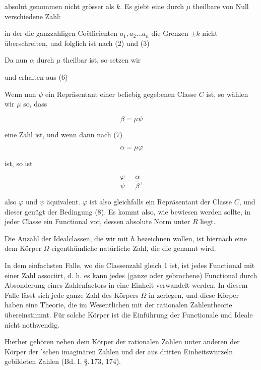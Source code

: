 absolut genommen nicht grösser als $k$. Es giebt eine durch $\mu$ theilbare von Null verschiedene Zahl:


in der die ganzzahligen Coëfficienten $a_1, a_2 \ldots a_n$ die Grenzen $\pm k$ nicht überschreiten, und folglich ist nach (2) und (3)


Da nun $\alpha$ durch $\mu$ theilbar ist, so setzen wir


und erhalten aus (6)


Wenn nun $\psi$ ein Repräsentant einer beliebig gegebenen Classe $C$ ist, so wählen wir $\mu$ so, dass

\[
\beta = \mu\psi
\]

eine Zahl ist, und wenn dann nach (7)

\[
\alpha = \mu\varphi
\]

ist, so ist

\[
\frac{\varphi}{\psi} = \frac{\alpha}{\beta},
\]

also $\varphi$ und $\psi$ äquivalent. $\varphi$ ist also gleichfalls ein Repräsentant der Classe $C$, und dieser genügt der Bedingung (8). Es kommt also, wie bewiesen werden sollte, in jeder Classe ein Functional vor, dessen absolute Norm unter $R$ liegt.

Die Anzahl der Idealclassen, die wir mit $h$ bezeichnen wollen, ist hiernach eine dem Körper $\Omega$ eigenthümliche natürliche Zahl, die die  genannt wird.

In dem einfachsten Falle, wo die Classenzahl gleich 1 ist, ist jedes Functional mit einer Zahl associirt, d. h. es kann jedes (ganze oder gebrochene) Functional durch Absonderung eines Zahlenfactors in eine Einheit verwandelt werden. In diesem Falle lässt sich jede ganze Zahl des Körpers $\Omega$ in  zerlegen, und diese Körper haben eine Theorie, die im Wesentlichen mit der rationalen Zahlentheorie übereinstimmt. Für solche Körper ist die Einführung der Functionale und Ideale nicht nothwendig.

Hierher gehören neben dem Körper der rationalen Zahlen unter anderen der Körper der 'schen imaginären Zahlen und der aus dritten Einheitswurzeln gebildeten Zahlen (Bd. I, \S.\,173, 174).

